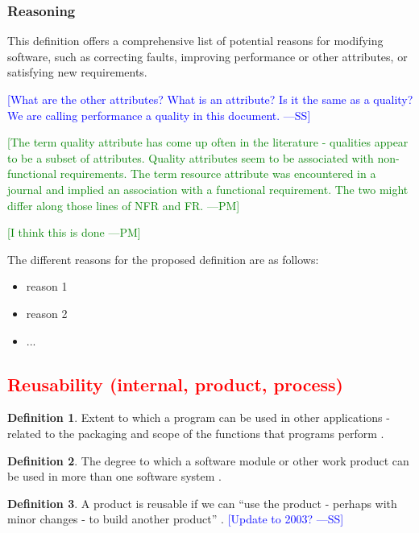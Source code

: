 \documentclass[letterpaper, cleveref]{lipics-v2019}
\newcommand{\authornote}[3]{\textcolor{#1}{[#3 ---#2]}}
\newcommand{\authornote}[3]{}
\newcommand{\wss}[1]{\authornote{blue}{SS}{#1}} %
\newcommand{\pmi}[1]{\authornote{green}{PM}{#1}} %
\newcommand{\notdone}[1]{\textcolor{red}{#1}}
\theoremstyle{definition}
\newtheorem{defn}{Definition}
\begin{document}
\subsubsection*{Reasoning}

This definition offers a comprehensive list of potential reasons for modifying
software, such as correcting faults, improving performance or other attributes,
or satisfying new requirements.

\wss{What are the other attributes?  What is an attribute?  Is it the same
as a quality?  We are calling performance a quality in this document.}

\pmi{The term quality attribute has come up often in the literature -
qualities appear to be a subset of attributes. Quality attributes seem to be
associated with non-functional requirements. The term resource attribute was
encountered in a journal and implied an association with a functional
requirement. The two might differ along those lines of NFR and FR.}

\pmi{I think this is done}

The different reasons for the proposed definition are as follows:

\begin{itemize}
  \item reason 1
  \item reason 2
  \item ...
\end{itemize}


\subsection{\notdone{Reusability (internal, product, process)}} %

\begin{defn}
  Extent to which a program can be used in other applications - related to
  the packaging and scope of the functions that programs perform
  \citep{McCallEtAl1977}.
\end{defn}

\begin{defn}
  The degree to which a software module or other work product can be used in
  more than one software system \citep{IEEEStdGlossarySET1990}.
\end{defn}

\begin{defn}
  A product is reusable if we can ``use the product - perhaps with minor changes
  - to build another product'' \citep{ghezzi1991fundamentals}.  \wss{Update
  to 2003?}
\end{defn}
\end{document}
